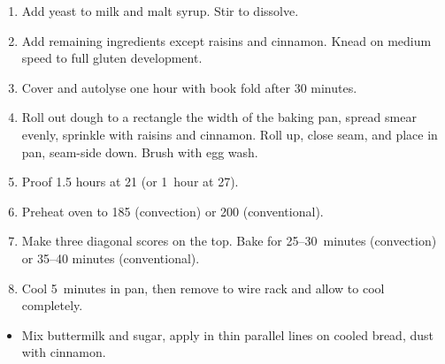 \begin{recipe}
  \begin{enumerate}

  \item Add yeast to milk and malt syrup.  Stir to dissolve.

  \item Add remaining ingredients except raisins and cinnamon.  Knead
    on medium speed to full gluten development.

  \item Cover and autolyse one hour with book fold after 30 minutes.

  \item Roll out dough to a rectangle the width of the baking pan,
    spread smear evenly, sprinkle with raisins and cinnamon.  Roll up,
    close seam, and place in pan, seam-side down.  Brush with egg wash.

  \item Proof 1.5 hours at 21\degreeC{} (or 1~hour at 27\degreeC).

  \item Preheat oven to 185\degreeC{} (convection) or 200\degreeC{} (conventional).

  \item Make three diagonal scores on the top.  Bake for
    25--30~minutes (convection) or 35--40 minutes (conventional).

  \item Cool 5~minutes in pan, then remove to wire rack and allow to
    cool completely.

  \end{enumerate}
\end{recipe}


\begin{ingredients}
\end{ingredients}

\begin{recipe}
  \begin{itemize}
  \item Mix buttermilk and sugar, apply in thin parallel lines on
    cooled bread, dust with cinnamon.
  \end{itemize}
\end{recipe}